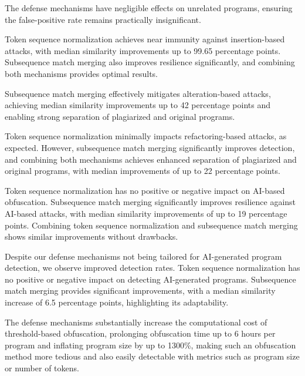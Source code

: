 \begin{description}[style=unboxed, leftmargin=0cm]
    \item[Effect on False Positives (\autoref{sec:eval-unrel}):] The defense mechanisms have negligible effects on unrelated programs, ensuring the false-positive rate remains practically insignificant.
    
    \item[Insertion-based Obfuscation (\autoref{sec:eval-insert}):] Token sequence normalization achieves near immunity against insertion-based attacks, with median similarity improvements up to 99.65 percentage points. Subsequence match merging also improves resilience significantly, and combining both mechanisms provides optimal results.
    
    \item[Alteration-based Obfuscation (\autoref{sec:eval-alter}):] Subsequence match merging effectively mitigates alteration-based attacks, achieving median similarity improvements up to 42 percentage points and enabling strong separation of plagiarized and original programs.
    
    \item[Refactoring-based Obfuscation (\autoref{sec:eval-refactor}):] Token sequence normalization minimally impacts refactoring-based attacks, as expected. However, subsequence match merging significantly improves detection, and combining both mechanisms achieves enhanced separation of plagiarized and original programs, with median improvements of up to 22 percentage points.
    
    \item[GPT-4-based Obfuscation (\autoref{sec:eval-gptobf}):] Token sequence normalization has no positive or negative impact on AI-based obfuscation. Subsequence match merging significantly improves resilience against AI-based attacks, with median similarity improvements of up to 19 percentage points. Combining token sequence normalization and subsequence match merging shows similar improvements without drawbacks.
    
    \item[GPT-4-generated Programs (\autoref{sec:eval-gptgen}):] Despite our defense mechanisms not being tailored for AI-generated program detection, we observe improved detection rates. Token sequence normalization has no positive or negative impact on detecting AI-generated programs. Subsequence match merging provides significant improvements, with a median similarity increase of 6.5 percentage points, highlighting its adaptability.
    
    \item[Threshold-based Plagiarism (\autoref{sec:eval-mossad}):] The defense mechanisms substantially increase the computational cost of threshold-based obfuscation, prolonging obfuscation time up to 6 hours per program and inflating program size by up to 1300\%, making such an obfuscation method more tedious and also easily detectable with metrics such as program size or number of tokens.
\end{description}


